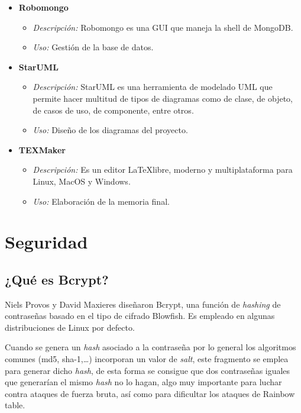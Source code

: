\begin{itemize}
\item \textbf{Robomongo}
\begin{itemize}
\item \textit{Descripción: }Robomongo es una GUI que maneja la shell de MongoDB\cite{robomongo}.
\item \textit{Uso: }Gestión de la base de datos.
\end{itemize}
\item \textbf{StarUML}
\begin{itemize}
\item \textit{Descripción: }StarUML es una herramienta de modelado UML que permite hacer multitud de tipos de diagramas como de clase, de objeto, de casos de uso, de componente, entre otros\cite{staruml}. 
\item \textit{Uso: }Diseño de los diagramas del proyecto.
\end{itemize}
\item \textbf{TEXMaker}
\begin{itemize}
\item \textit{Descripción: }Es un editor \LaTeX   libre, moderno y multiplataforma para Linux, MacOS y Windows\cite{texmaker}.
\item \textit{Uso: }Elaboración de la memoria final.
\end{itemize}
\end{itemize}

\section{Seguridad}
\subsection{¿Qué es Bcrypt?}
Niels Provos y David Maxieres diseñaron Bcrypt, una función de \textit{hashing} de contraseñas basado en el tipo de cifrado Blowfish. Es empleado en algunas distribuciones de Linux por defecto. 


Cuando se genera un \textit{hash} asociado a la contraseña por lo general los algoritmos comunes (md5, sha-1,…) incorporan un valor de \textit{salt}, este fragmento se emplea para generar dicho \textit{hash}, de esta forma se consigue que dos contraseñas iguales que generarían el mismo \textit{hash} no lo hagan, algo muy importante para luchar contra ataques de fuerza bruta, así como para dificultar los ataques de Rainbow table.


